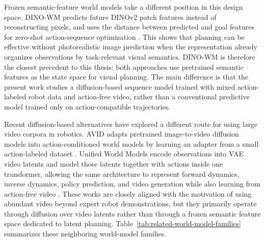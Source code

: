 \documentclass[12pt]{report}
\begin{document}
Frozen semantic-feature world models take a different position in this design space. DINO-WM predicts future DINOv2 patch features instead of reconstructing pixels, and uses the distance between predicted and goal features for zero-shot action-sequence optimization \cite{zhou2024dinowm}. This shows that planning can be effective without photorealistic image prediction when the representation already organizes observations by task-relevant visual semantics. DINO-WM is therefore the closest precedent to this thesis: both approaches use pretrained semantic features as the state space for visual planning. The main difference is that the present work studies a diffusion-based sequence model trained with mixed action-labeled robot data and action-free video, rather than a conventional predictive model trained only on action-compatible trajectories.

Recent diffusion-based alternatives have explored a different route for using large video corpora in robotics. AVID adapts pretrained image-to-video diffusion models into action-conditioned world models by learning an adapter from a small action-labeled dataset \cite{rigter2024avid}. Unified World Models encode observations into VAE video latents and model those latents together with actions inside one transformer, allowing the same architecture to represent forward dynamics, inverse dynamics, policy prediction, and video generation while also learning from action-free video \cite{zhu2025uwm}. These works are closely aligned with the motivation of using abundant video beyond expert robot demonstrations, but they primarily operate through diffusion over video latents rather than through a frozen semantic feature space dedicated to latent planning. Table~\ref{tab:related-world-model-families} summarizes these neighboring world-model families.
\end{document}
